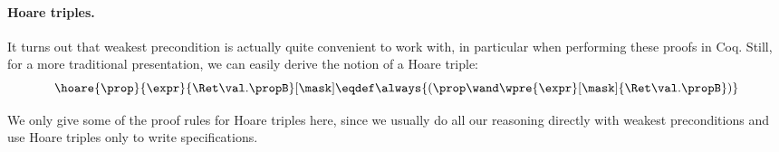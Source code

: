 \paragraph{Hoare triples.}
It turns out that weakest precondition is actually quite convenient to work with, in particular when performing these proofs in Coq.
Still, for a more traditional presentation, we can easily derive the notion of a Hoare triple:
\[
\hoare{\prop}{\expr}{\Ret\val.\propB}[\mask] \eqdef \always{(\prop \wand \wpre{\expr}[\mask]{\Ret\val.\propB})}
\]

We only give some of the proof rules for Hoare triples here, since we usually do all our reasoning directly with weakest preconditions and use Hoare triples only to write specifications.
